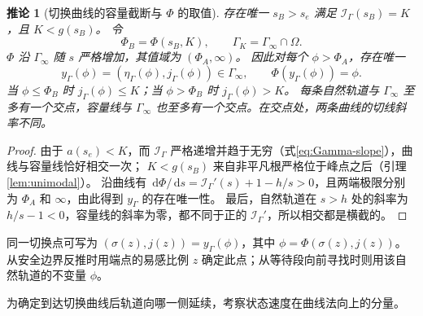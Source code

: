 \documentclass[lang=cn,a4paper,newtx]{elegantpaper}
\theoremstyle{plain}
\newtheorem{papercorollary}[theorem]{推论}
\theoremstyle{definition}
\newcommand{\dd}{\,\mathrm d}
\begin{document}
\begin{papercorollary}[切换曲线的容量截断与 $\Phi$ 的取值]
\label{cor:Gamma-labels}
存在唯一 $s_B>s_e$ 满足 $\mathcal I_\Gamma(s_B)=K$，且 $K<g(s_B)$。
令
\begin{equation}
\Phi_B=\Phi(s_B,K),\qquad \Gamma_K=\Gamma_\infty\cap\Omega.
\label{eq:PhiB}
\end{equation}
$\Phi$ 沿 $\Gamma_\infty$ 随 $s$ 严格增加，其值域为 $(\Phi_A,\infty)$。
因此对每个 $\phi>\Phi_A$，存在唯一
\begin{equation}
y_\Gamma(\phi)=(\eta_\Gamma(\phi),j_\Gamma(\phi))\in\Gamma_\infty,
\qquad \Phi(y_\Gamma(\phi))=\phi.
\label{eq:Gamma-hit-map}
\end{equation}
当 $\phi\le\Phi_B$ 时 $j_\Gamma(\phi)\le K$；当 $\phi>\Phi_B$ 时 $j_\Gamma(\phi)>K$。
每条自然轨道与 $\Gamma_\infty$ 至多有一个交点，容量线与 $\Gamma_\infty$ 也至多有一个交点。在交点处，两条曲线的切线斜率不同。
\end{papercorollary}
\begin{proof}
由于 $a(s_e)<K$，而 $\mathcal I_\Gamma$ 严格递增并趋于无穷（式\eqref{eq:Gamma-slope}），曲线与容量线恰好相交一次；
$K<g(s_B)$ 来自非平凡根严格位于峰点之后（引理\ref{lem:unimodal}）。
沿曲线有 $\dd\Phi/\dd s=\mathcal I_\Gamma'(s)+1-h/s>0$，且两端极限分别为 $\Phi_A$ 和 $\infty$，由此得到 $y_\Gamma$ 的存在唯一性。
最后，自然轨道在 $s>h$ 处的斜率为 $h/s-1<0$，容量线的斜率为零，都不同于正的 $\mathcal I_\Gamma'$，所以相交都是横截的。
\end{proof}

同一切换点可写为 $(\sigma(z),j(z))=y_\Gamma(\phi)$，其中 $\phi=\Phi(\sigma(z),j(z))$。从安全边界反推时用端点的易感比例 $z$ 确定此点；从等待段向前寻找时则用该自然轨道的不变量 $\phi$。

为确定到达切换曲线后轨道向哪一侧延续，考察状态速度在曲线法向上的分量。
\end{document}
